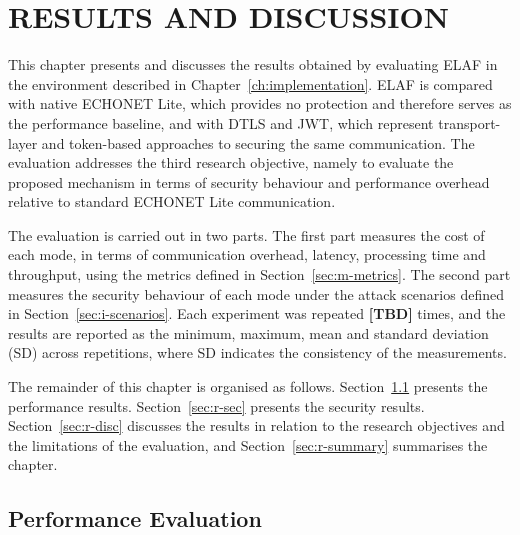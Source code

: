 \providecommand{\tbd}{\textbf{[TBD]}}

\chapter{RESULTS AND DISCUSSION}
\label{ch:results}

This chapter presents and discusses the results obtained by evaluating ELAF in the environment described in Chapter~\ref{ch:implementation}. ELAF is compared with native ECHONET Lite, which provides no protection and therefore serves as the performance baseline, and with DTLS and JWT, which represent transport-layer and token-based approaches to securing the same communication. The evaluation addresses the third research objective, namely to evaluate the proposed mechanism in terms of security behaviour and performance overhead relative to standard ECHONET Lite communication.

The evaluation is carried out in two parts. The first part measures the cost of each mode, in terms of communication overhead, latency, processing time and throughput, using the metrics defined in Section~\ref{sec:m-metrics}. The second part measures the security behaviour of each mode under the attack scenarios defined in Section~\ref{sec:i-scenarios}. Each experiment was repeated \tbd{} times, and the results are reported as the minimum, maximum, mean and standard deviation (SD) across repetitions, where SD indicates the consistency of the measurements.

The remainder of this chapter is organised as follows. Section~\ref{sec:r-perf} presents the performance results. Section~\ref{sec:r-sec} presents the security results. Section~\ref{sec:r-disc} discusses the results in relation to the research objectives and the limitations of the evaluation, and Section~\ref{sec:r-summary} summarises the chapter.

\section{Performance Evaluation}
\label{sec:r-perf}

